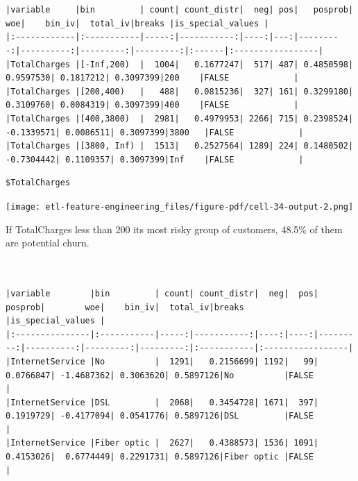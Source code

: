 \documentclass[
  letterpaper,
  DIV=11,
  numbers=noendperiod]{scrreprt}
\newenvironment{Shaded}{\begin{snugshade}}{\end{snugshade}}
\newcommand{\CommentTok}[1]{\textcolor[rgb]{0.37,0.37,0.37}{#1}}
\newcommand{\FunctionTok}[1]{\textcolor[rgb]{0.28,0.35,0.67}{#1}}
\newcommand{\NormalTok}[1]{\textcolor[rgb]{0.00,0.23,0.31}{#1}}
\newcommand{\SpecialCharTok}[1]{\textcolor[rgb]{0.37,0.37,0.37}{#1}}
\begin{document}
\begin{verbatim}


|variable     |bin         | count| count_distr|  neg| pos|   posprob|        woe|    bin_iv|  total_iv|breaks |is_special_values |
|:------------|:-----------|-----:|-----------:|----:|---:|---------:|----------:|---------:|---------:|:------|:-----------------|
|TotalCharges |[-Inf,200)  |  1004|   0.1677247|  517| 487| 0.4850598|  0.9597530| 0.1817212| 0.3097399|200    |FALSE             |
|TotalCharges |[200,400)   |   488|   0.0815236|  327| 161| 0.3299180|  0.3109760| 0.0084319| 0.3097399|400    |FALSE             |
|TotalCharges |[400,3800)  |  2981|   0.4979953| 2266| 715| 0.2398524| -0.1339571| 0.0086511| 0.3097399|3800   |FALSE             |
|TotalCharges |[3800, Inf) |  1513|   0.2527564| 1289| 224| 0.1480502| -0.7304442| 0.1109357| 0.3097399|Inf    |FALSE             |
\end{verbatim}

\begin{Shaded}
\end{Shaded}

\begin{verbatim}
$TotalCharges
\end{verbatim}

\texttt{[image: etl-feature-engineering\_files/figure-pdf/cell-34-output-2.png]}

If TotalCharges less than 200 its most risky group of customers, 48.5\%
of them are potential churn.

\begin{Shaded}
\end{Shaded}

\begin{verbatim}


|variable        |bin         | count| count_distr|  neg|  pos|   posprob|        woe|    bin_iv|  total_iv|breaks      |is_special_values |
|:---------------|:-----------|-----:|-----------:|----:|----:|---------:|----------:|---------:|---------:|:-----------|:-----------------|
|InternetService |No          |  1291|   0.2156699| 1192|   99| 0.0766847| -1.4687362| 0.3063620| 0.5897126|No          |FALSE             |
|InternetService |DSL         |  2068|   0.3454728| 1671|  397| 0.1919729| -0.4177094| 0.0541776| 0.5897126|DSL         |FALSE             |
|InternetService |Fiber optic |  2627|   0.4388573| 1536| 1091| 0.4153026|  0.6774449| 0.2291731| 0.5897126|Fiber optic |FALSE             |
\end{verbatim}
\end{document}
